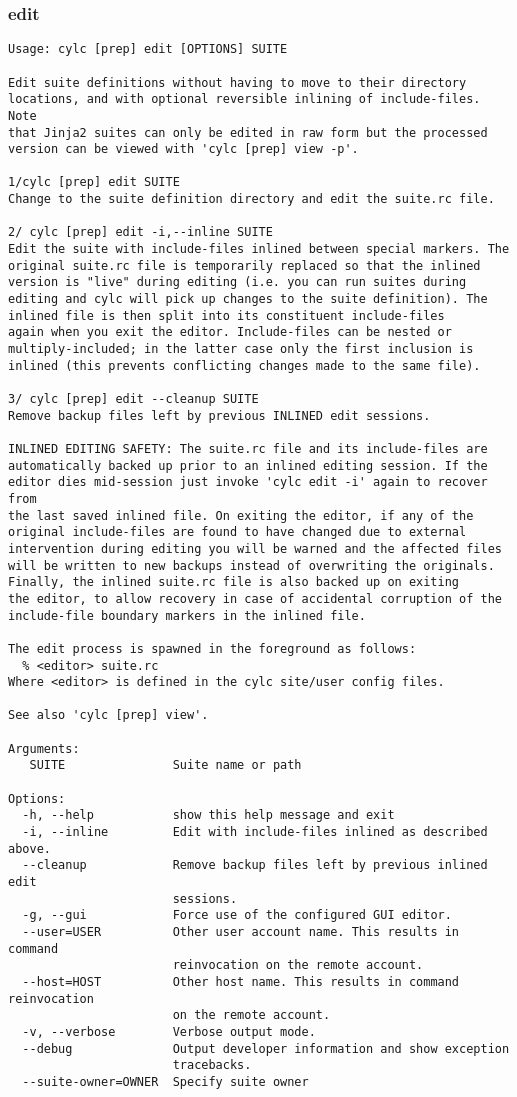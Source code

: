 \subsubsection{edit}
\label{edit}
\begin{lstlisting}
Usage: cylc [prep] edit [OPTIONS] SUITE 

Edit suite definitions without having to move to their directory
locations, and with optional reversible inlining of include-files. Note
that Jinja2 suites can only be edited in raw form but the processed
version can be viewed with 'cylc [prep] view -p'.

1/cylc [prep] edit SUITE
Change to the suite definition directory and edit the suite.rc file.

2/ cylc [prep] edit -i,--inline SUITE
Edit the suite with include-files inlined between special markers. The
original suite.rc file is temporarily replaced so that the inlined
version is "live" during editing (i.e. you can run suites during
editing and cylc will pick up changes to the suite definition). The
inlined file is then split into its constituent include-files
again when you exit the editor. Include-files can be nested or
multiply-included; in the latter case only the first inclusion is
inlined (this prevents conflicting changes made to the same file).

3/ cylc [prep] edit --cleanup SUITE
Remove backup files left by previous INLINED edit sessions.

INLINED EDITING SAFETY: The suite.rc file and its include-files are
automatically backed up prior to an inlined editing session. If the
editor dies mid-session just invoke 'cylc edit -i' again to recover from
the last saved inlined file. On exiting the editor, if any of the
original include-files are found to have changed due to external
intervention during editing you will be warned and the affected files
will be written to new backups instead of overwriting the originals.
Finally, the inlined suite.rc file is also backed up on exiting
the editor, to allow recovery in case of accidental corruption of the
include-file boundary markers in the inlined file.

The edit process is spawned in the foreground as follows:
  % <editor> suite.rc
Where <editor> is defined in the cylc site/user config files.

See also 'cylc [prep] view'.

Arguments:
   SUITE               Suite name or path

Options:
  -h, --help           show this help message and exit
  -i, --inline         Edit with include-files inlined as described above.
  --cleanup            Remove backup files left by previous inlined edit
                       sessions.
  -g, --gui            Force use of the configured GUI editor.
  --user=USER          Other user account name. This results in command
                       reinvocation on the remote account.
  --host=HOST          Other host name. This results in command reinvocation
                       on the remote account.
  -v, --verbose        Verbose output mode.
  --debug              Output developer information and show exception
                       tracebacks.
  --suite-owner=OWNER  Specify suite owner
\end{lstlisting}
